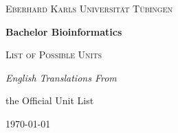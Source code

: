 \documentclass[a4paper]{report}
\begin{document}
	\begin{titlepage}
		\centering
		
		{\scshape\LARGE Eberhard Karls Universität Tübingen \par}
		\vspace{1cm}
		{\huge\bfseries Bachelor Bioinformatics \par}
		\vspace{1.5cm}
		{\scshape\Large List of Possible Units \par}
		\vspace{2cm}
		{\Large\itshape English Translations From \par the Official Unit List \par}
		\vfill
		
		\vfill
		
		{\large \today\par}
	\end{titlepage}
	
	\tableofcontents
	
	
	
%	
	
%	
%	
	
\end{document}
